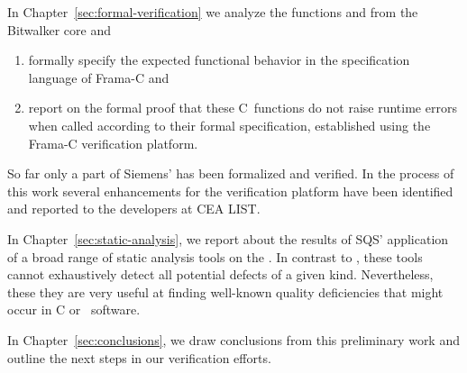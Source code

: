 In Chapter~\ref{sec:formal-verification} we analyze
the functions \peek and \poke from the Bitwalker core and
\begin{enumerate}
\item formally specify the
      expected functional behavior in the \acsl specification language of {Frama-C}
      and
\item report on the formal proof 
	that these
      C~functions do not raise runtime errors when called according to their
      formal specification, established using 
      the {Frama-C} verification platform.
\end{enumerate}

So far only a part of Siemens' \bitwalker has been formalized and verified.
In the process of this work several enhancements for the \framac verification platform
have been identified and reported to the developers at {CEA LIST}.

In Chapter~\ref{sec:static-analysis}, we report about the results of
SQS' application of a broad range of static analysis tools on the \bitwalker. 
In contrast to \framac, these tools cannot exhaustively
detect all potential defects of a given kind.
Nevertheless, these they are very useful at finding well-known quality deficiencies that
might occur in C or \CC\ software.

In Chapter~\ref{sec:conclusions}, we draw conclusions from this preliminary work
and outline the next steps in our verification efforts.


